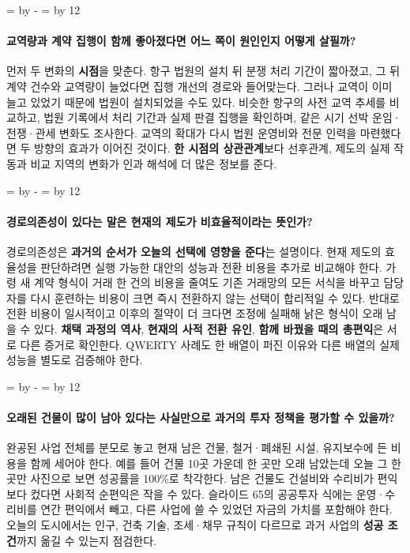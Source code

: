 \documentclass[10pt,a4paper]{article}
\newcommand{\ReserveQuestionSpace}{%
  \par\begingroup
  \dimen0=\pagegoal \advance\dimen0 by -\pagetotal
  \dimen2=\baselineskip \multiply\dimen2 by 12
  \ifdim\dimen0<\dimen2 \newpage\fi
  \endgroup}
\begin{document}
\ReserveQuestionSpace
\paragraph{교역량과 계약 집행이 함께 좋아졌다면 어느 쪽이 원인인지 어떻게 살필까?}

먼저 두 변화의 \textbf{시점}을 맞춘다. 항구 법원의 설치 뒤 분쟁 처리 기간이 짧아졌고, 그 뒤 계약 건수와 교역량이 늘었다면 집행 개선의 경로와 들어맞는다. 그러나 교역이 이미 늘고 있었기 때문에 법원이 설치되었을 수도 있다. 비슷한 항구의 사전 교역 추세를 비교하고, 법원 기록에서 처리 기간과 실제 판결 집행을 확인하며, 같은 시기 선박 운임·전쟁·관세 변화도 조사한다. 교역의 확대가 다시 법원 운영비와 전문 인력을 마련했다면 두 방향의 효과가 이어진 것이다. \textbf{한 시점의 상관관계}보다 선후관계, 제도의 실제 작동과 비교 지역의 변화가 인과 해석에 더 많은 정보를 준다.\par

\ReserveQuestionSpace
\paragraph{경로의존성이 있다는 말은 현재의 제도가 비효율적이라는 뜻인가?}

경로의존성은 \textbf{과거의 순서가 오늘의 선택에 영향을 준다}는 설명이다. 현재 제도의 효율성을 판단하려면 실행 가능한 대안의 성능과 전환 비용을 추가로 비교해야 한다. 가령 새 계약 형식이 거래 한 건의 비용을 줄여도 기존 거래망의 모든 서식을 바꾸고 담당자를 다시 훈련하는 비용이 크면 즉시 전환하지 않는 선택이 합리적일 수 있다. 반대로 전환 비용이 일시적이고 이후의 절약이 더 크다면 조정에 실패해 낡은 형식이 오래 남을 수 있다. \textbf{채택 과정의 역사}, \textbf{현재의 사적 전환 유인}, \textbf{함께 바꿨을 때의 총편익}은 서로 다른 증거로 확인한다. QWERTY 사례도 한 배열이 퍼진 이유와 다른 배열의 실제 성능을 별도로 검증해야 한다.\par

\ReserveQuestionSpace
\paragraph{오래된 건물이 많이 남아 있다는 사실만으로 과거의 투자 정책을 평가할 수 있을까?}

완공된 사업 전체를 분모로 놓고 현재 남은 건물, 철거·폐쇄된 시설, 유지보수에 든 비용을 함께 세어야 한다. 예를 들어 건물 10곳 가운데 한 곳만 오래 남았는데 오늘 그 한 곳만 사진으로 보면 성공률을 100\%로 착각한다. 남은 건물도 건설비와 수리비가 편익보다 컸다면 사회적 순편익은 작을 수 있다. 슬라이드 65의 공공투자 식에는 운영·수리비를 연간 편익에서 빼고, 다른 사업에 쓸 수 있었던 자금의 가치를 포함해야 한다. 오늘의 도시에서는 인구, 건축 기술, 조세·채무 규칙이 다르므로 과거 사업의 \textbf{성공 조건}까지 옮길 수 있는지 점검한다.\par
\end{document}
